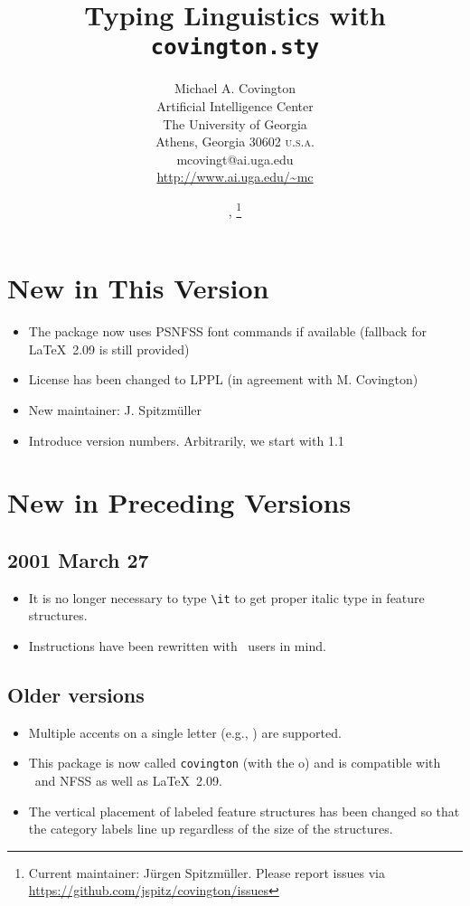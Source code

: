 \documentclass{article}
\title{\textbf{Typing Linguistics with \texttt{covington.sty}}}
\author{Michael A. Covington \\
        \small Artificial Intelligence Center \\
        \small The University of Georgia \\
        \small Athens, Georgia 30602 \textsc{u.s.a.}\\
        mcovingt@ai.uga.edu\\
        \url{http://www.ai.uga.edu/~mc}}
\date{\pversion, \pdate\thanks{Current maintainer: J\"urgen Spitzm\"uller.
      Please report issues via \protect\url{https://github.com/jspitz/covington/issues}}}
\begin{document}
\maketitle
{\footnotesize \tableofcontents}

\section*{New in This Version}
\begin{itemize}
\item The package now uses PSNFSS font commands if available (fallback for \LaTeX\ 2.09 is still provided)
\item License has been changed to LPPL (in agreement with M. Covington)
\item New maintainer: J. Spitzm\"uller
\item Introduce version numbers. Arbitrarily, we start with 1.1
\end{itemize}

\section*{New in Preceding Versions}
\subsection*{2001 March 27}
\begin{itemize}
\item It is no longer necessary to type \verb"\it" to get proper italic type in feature structures.
\item Instructions have been rewritten with \LaTeXe\ users in mind.
\end{itemize}

\subsection*{Older versions}
\begin{itemize}
\item Multiple accents on a single letter (e.g., \emph{}) are supported.
\item This package is now called \texttt{covington} (with the o)
and is compatible with \LaTeXe\ and NFSS as well as \LaTeX\ 2.09.
\item The vertical placement of labeled feature structures has 
been changed
so that the category labels line up regardless of the size of
the structures.
\end{itemize}
\end{document}

